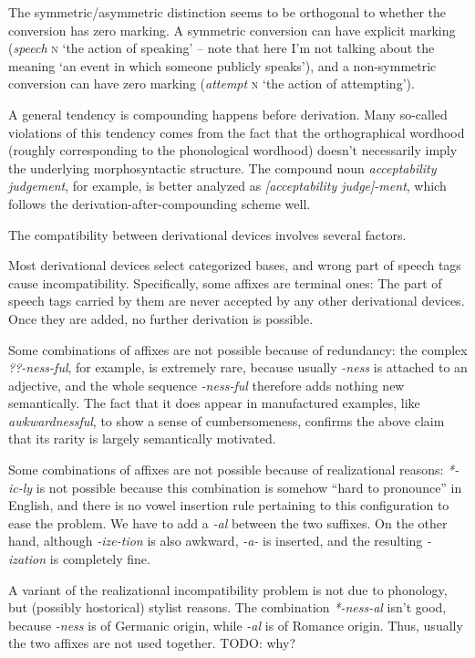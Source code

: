 \documentclass[UTF8, a4paper, oneside, scheme=plain]{ctexrep}
\newcommand{\corpus}[1]{\emph{#1}}
\newcommand{\corpuscat}[1]{\textsc{#1}}
\newcommand{\translate}[1]{`#1'}
\begin{document}
The symmetric/asymmetric distinction seems to be orthogonal to 
whether the conversion has zero marking.
A symmetric conversion can have explicit marking
(\corpus{speech} \corpuscat{n} \translate{the action of speaking} -- 
note that here I'm not talking about the meaning \translate{an event in which someone publicly speaks}), 
and a non-symmetric conversion can have zero marking
(\corpus{attempt} \corpuscat{n} \translate{the action of attempting}).

A general tendency is compounding happens before derivation.
Many so-called violations of this tendency comes from the fact 
that the orthographical wordhood 
(roughly corresponding to the phonological wordhood)
doesn't necessarily imply the underlying morphosyntactic structure.
The compound noun \corpus{acceptability judgement},
for example, is better analyzed as 
\corpus{[acceptability judge]-ment},
which follows the derivation-after-compounding scheme well.

The compatibility between derivational devices involves several factors.
\begin{enumerate*}
    \item Most derivational devices select categorized bases,
    and wrong part of speech tags cause incompatibility.
    Specifically, some affixes are terminal ones:
    The part of speech tags carried by them are never accepted by any other derivational devices.
    Once they are added,
    no further derivation is possible. %
    \item Some combinations of affixes are not possible because of redundancy:
    the complex \corpus{??-ness-ful},
    for example, is extremely rare,
    because usually \corpus{-ness} is attached to an adjective,
    and the whole sequence \corpus{-ness-ful} therefore adds nothing new semantically.
    The fact that it does appear in manufactured examples, like \corpus{awkwardnessful},
    to show a sense of cumbersomeness,
    confirms the above claim that its rarity is largely semantically motivated.
    \item Some combinations of affixes are not possible because of realizational reasons:
    \corpus{*-ic-ly} is not possible 
    because this combination is somehow ``hard to pronounce'' in English,
    and there is no vowel insertion rule pertaining to this configuration to ease the problem.
    We have to add a \corpus{-al} between the two suffixes.
    On the other hand, although \corpus{-ize-tion} is also awkward,
    \corpus{-a-} is inserted, and the resulting \corpus{-ization} is completely fine.
    \item A variant of the realizational incompatibility problem is 
    not due to phonology, but (possibly hostorical) stylist reasons.
    The combination \corpus{*-ness-al} isn't good,
    because \corpus{-ness} is of Germanic origin,
    while \corpus{-al} is of Romance origin.
    Thus, usually the two affixes are not used together. TODO: why?
\end{enumerate*}
\end{document}
